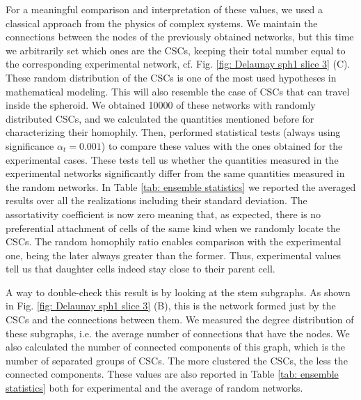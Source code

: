\documentclass[fleqn,10pt]{wlscirep}
\begin{document}
For a meaningful comparison and interpretation of these values, we used a classical approach from the physics of complex systems. We maintain the connections between the nodes of the previously obtained networks, but this time we arbitrarily set which ones are the CSCs, keeping their total number equal to the corresponding experimental network, cf. Fig. \ref{fig: Delaunay sph1 slice 3} (C). These random distribution of the CSCs is one of the most used hypotheses in mathematical modeling. This will also resemble the case of CSCs that can travel inside the spheroid. We obtained 10000 of these networks with randomly distributed CSCs, and we calculated the quantities mentioned before for characterizing their homophily. Then, performed statistical tests (always using significance $\alpha_t=0.001$) to compare these values with the ones obtained for the experimental cases. These tests tell us whether the quantities measured in the experimental networks significantly differ from the same quantities measured in the random networks. In Table \ref{tab: ensemble statistics} we reported the averaged results over all the realizations including their standard deviation. The assortativity coefficient is now zero meaning that, as expected, there is no preferential attachment of cells of the same kind when we randomly locate the CSCs. The random homophily ratio enables comparison with the experimental one, being the later always greater than the former. Thus, experimental values tell us that daughter cells indeed stay close to their parent cell. 

A way to double-check this result is by looking at the stem subgraphs. As shown in Fig. \ref{fig: Delaunay sph1 slice 3} (B), this is the network formed just by the CSCs and the connections between them. We measured the degree distribution of these subgraphs, i.e. the average number of connections that have the nodes. We also calculated the number of connected components of this graph, which is the number of separated groups of CSCs. The more clustered the CSCs, the less the connected components. These values are also reported in Table \ref{tab: ensemble statistics} both for experimental and the average of random networks.
\end{document}
